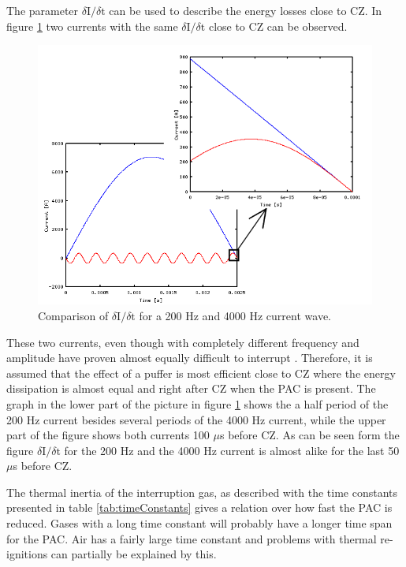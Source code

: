 \documentclass[10pt,b5paper,twoside]{article}
\begin{document}
The parameter $\delta \mathrm{I}/\delta \mathrm{t}$ can be used to describe the energy losses close to CZ. In figure \ref{fig:freqComp} two currents with the same $\delta \mathrm{I}/\delta \mathrm{t}$ close to CZ can be observed.

\begin{figure} [H]
\centering
\includegraphics[scale=0.6]{Bilder/Theory/diffFreq3.png}
\caption{Comparison of $\delta \mathrm{I}/\delta \mathrm{t}$ for a 200 Hz and 4000 Hz current wave.} \label{fig:freqComp}
\end{figure}

These two currents, even though with completely different frequency and amplitude have proven almost equally difficult to interrupt \cite{bib:CIHVN}. Therefore, it is assumed that the effect of a puffer is most efficient close to CZ where the energy dissipation is almost equal and right after CZ when the PAC is present. The graph in the lower part of the picture in figure \ref{fig:freqComp} shows the a half period of the 200 Hz current besides several periods of the 4000 Hz current, while the upper part of the figure shows both currents 100 $\mu$s before CZ. As can be seen form the figure $\delta \mathrm{I}/\delta \mathrm{t}$ for the 200 Hz and the 4000 Hz current is almost alike for the last 50 $\mu$s before CZ.

The thermal inertia of the interruption gas, as described with the time constants presented in table \ref{tab:timeConstants} gives a relation over how fast the PAC is reduced. Gases with a long time constant will probably have a longer time span for the PAC. Air has a fairly large time constant and problems with thermal re-ignitions can partially be explained by this.
\end{document}
